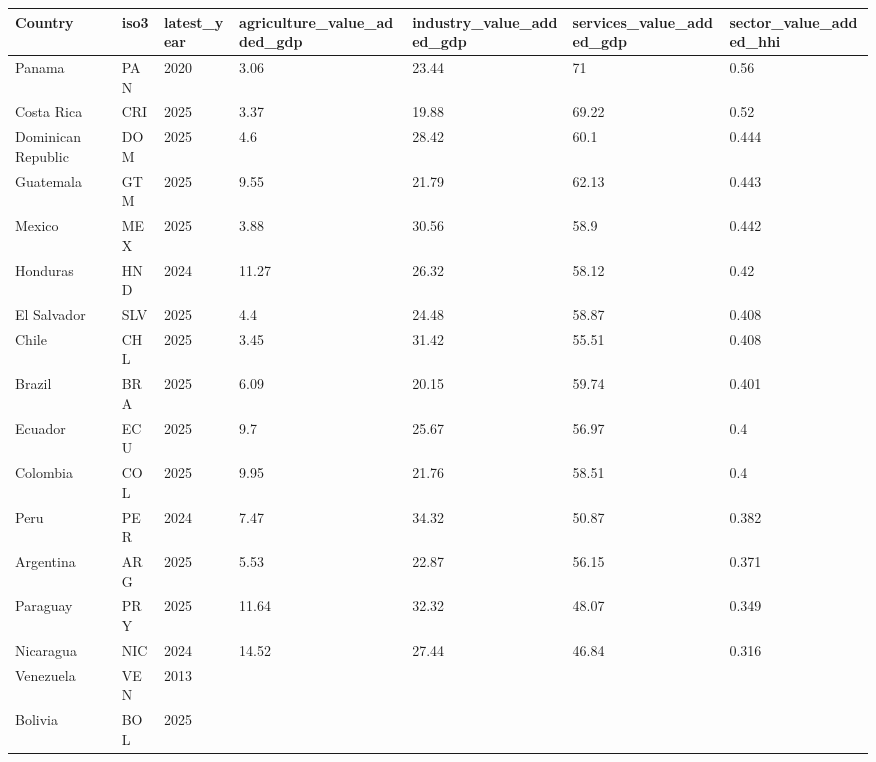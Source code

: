 ﻿%
\begin{tabular}{lllllll}
\hline
Country & iso3 & latest_year & agriculture_value_added_gdp & industry_value_added_gdp & services_value_added_gdp & sector_value_added_hhi \\
\hline
Panama & PAN & 2020 & 3.06 & 23.44 & 71 & 0.56 \\
Costa Rica & CRI & 2025 & 3.37 & 19.88 & 69.22 & 0.52 \\
Dominican Republic & DOM & 2025 & 4.6 & 28.42 & 60.1 & 0.444 \\
Guatemala & GTM & 2025 & 9.55 & 21.79 & 62.13 & 0.443 \\
Mexico & MEX & 2025 & 3.88 & 30.56 & 58.9 & 0.442 \\
Honduras & HND & 2024 & 11.27 & 26.32 & 58.12 & 0.42 \\
El Salvador & SLV & 2025 & 4.4 & 24.48 & 58.87 & 0.408 \\
Chile & CHL & 2025 & 3.45 & 31.42 & 55.51 & 0.408 \\
Brazil & BRA & 2025 & 6.09 & 20.15 & 59.74 & 0.401 \\
Ecuador & ECU & 2025 & 9.7 & 25.67 & 56.97 & 0.4 \\
Colombia & COL & 2025 & 9.95 & 21.76 & 58.51 & 0.4 \\
Peru & PER & 2024 & 7.47 & 34.32 & 50.87 & 0.382 \\
Argentina & ARG & 2025 & 5.53 & 22.87 & 56.15 & 0.371 \\
Paraguay & PRY & 2025 & 11.64 & 32.32 & 48.07 & 0.349 \\
Nicaragua & NIC & 2024 & 14.52 & 27.44 & 46.84 & 0.316 \\
Venezuela & VEN & 2013 &  &  &  &  \\
Bolivia & BOL & 2025 &  &  &  &  \\
\hline
\end{tabular}

